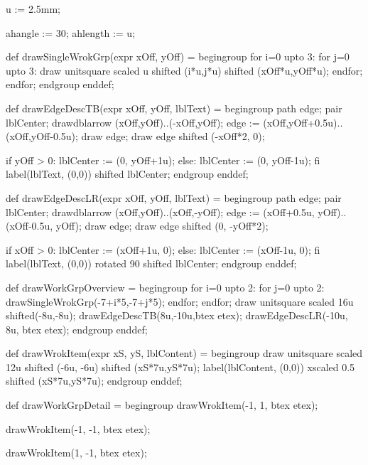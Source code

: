 u := 2.5mm;

ahangle := 30;
ahlength := u;

def drawSingleWrokGrp(expr xOff, yOff) =
begingroup
for i=0 upto 3:
	for j=0 upto 3:
		draw unitsquare scaled u shifted (i*u,j*u) shifted (xOff*u,yOff*u);
	endfor;
endfor;
endgroup
enddef;

def drawEdgeDescTB(expr xOff, yOff, lblText) =
begingroup
path edge;
pair lblCenter;
drawdblarrow (xOff,yOff)..(-xOff,yOff);
edge := (xOff,yOff+0.5u)..(xOff,yOff-0.5u);
draw edge;
draw edge shifted (-xOff*2, 0);

if yOff > 0:
lblCenter := (0, yOff+1u);
else:
lblCenter := (0, yOff-1u);
fi
label(lblText, (0,0)) shifted lblCenter;
endgroup
enddef;

def drawEdgeDescLR(expr xOff, yOff, lblText) =
begingroup
path edge;
pair lblCenter;
drawdblarrow (xOff,yOff)..(xOff,-yOff);
edge := (xOff+0.5u, yOff)..(xOff-0.5u, yOff);
draw edge;
draw edge shifted (0, -yOff*2);

if xOff > 0:
lblCenter := (xOff+1u, 0);
else:
lblCenter := (xOff-1u, 0);
fi
label(lblText, (0,0)) rotated 90 shifted lblCenter;
endgroup
enddef;

def drawWorkGrpOverview =
begingroup
for i=0 upto 2:
	for j=0 upto 2:
		drawSingleWrokGrp(-7+i*5,-7+j*5);
	endfor;
endfor;
draw unitsquare scaled 16u shifted(-8u,-8u);
drawEdgeDescTB(8u,-10u,btex  etex);
drawEdgeDescLR(-10u, 8u, btex  etex);
endgroup
enddef;

def drawWrokItem(expr xS, yS, lblContent) =
begingroup
draw unitsquare scaled 12u shifted (-6u, -6u) shifted (xS*7u,yS*7u);
label(lblContent, (0,0)) xscaled 0.5 shifted (xS*7u,yS*7u);
endgroup
enddef;

def drawWorkGrpDetail =
begingroup
drawWrokItem(-1, 1, btex  etex);

drawWrokItem(-1, -1, btex  etex);

drawWrokItem(1, -1, btex  etex);

